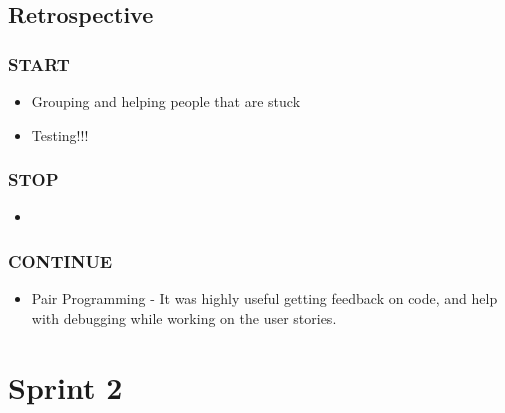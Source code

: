 \documentclass[]{report}
\begin{document}
		\section*{Retrospective}
			\subsection*{START}
				\begin{itemize}
					\item Grouping and helping people that are stuck
					\item Testing!!!
				\end{itemize}
			\subsection*{STOP}
				\begin{itemize}
					\item 
				\end{itemize}
			\subsection*{CONTINUE}
				\begin{itemize}
					\item Pair Programming - It was highly useful getting feedback on code, and help with debugging while working on the user stories.
				\end{itemize}
	\chapter*{Sprint 2}
\end{document}
